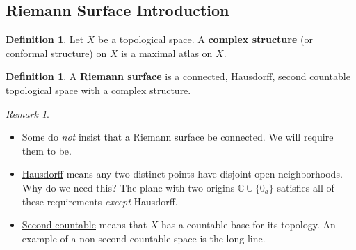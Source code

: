 \documentclass[12pt]{article}
\newcommand{\cx}{\mathbb{C}}
\newcommand{\ita}[1]{\textit{#1}}
\theoremstyle{definition}
\newtheorem{definition}[theorem]{Definition}
\theoremstyle{remark}
\newtheorem*{remark}{Remark}
\begin{document}
\subsection{Riemann Surface Introduction}
\begin{definition}
    Let $X$ be a topological space. A \textbf{complex structure} (or conformal structure) on $X$ is a maximal atlas on $X$.
\end{definition}
\begin{definition}
    A \textbf{Riemann surface} is a connected, Hausdorff, second countable topological space with a complex structure.
\end{definition}
\begin{remark}
    \noindent
    \begin{itemize}
        \item Some do \ita{not} insist that a Riemann surface be connected. We will require them to be.
        \item \underline{Hausdorff} means any two distinct points have disjoint open neighborhoods. Why do we need this? The plane with two origins $\cx\cup\{0_a\}$ satisfies all of these requirements \ita{except} Hausdorff.
        \item \underline{Second countable} means that $X$ has a countable base for its topology. An example of a non-second countable space is the long line.
    \end{itemize}
\end{remark}
\end{document}
